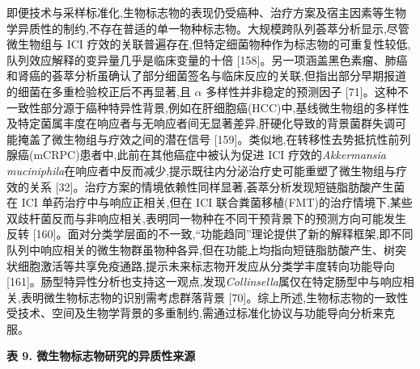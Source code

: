 即便技术与采样标准化,生物标志物的表现仍受癌种、治疗方案及宿主因素等生物学异质性的制约,不存在普适的单一物种标志物。大规模跨队列荟萃分析显示,尽管微生物组与 ICI 疗效的关联普遍存在,但特定细菌物种作为标志物的可重复性较低,队列效应解释的变异量几乎是临床变量的十倍 {[}158{]}。另一项涵盖黑色素瘤、肺癌和肾癌的荟萃分析虽确认了部分细菌签名与临床反应的关联,但指出部分早期报道的细菌在多重检验校正后不再显著,且 \(\alpha\) 多样性并非稳定的预测因子 {[}71{]}。这种不一致性部分源于癌种特异性背景,例如在肝细胞癌(HCC)中,基线微生物组的多样性及特定菌属丰度在响应者与无响应者间无显著差异,肝硬化导致的背景菌群失调可能掩盖了微生物组与疗效之间的潜在信号 {[}159{]}。类似地,在转移性去势抵抗性前列腺癌(mCRPC)患者中,此前在其他癌症中被认为促进 ICI 疗效的\emph{Akkermansia muciniphila}在响应者中反而减少,提示既往内分泌治疗史可能重塑了微生物组与疗效的关系 {[}32{]}。治疗方案的情境依赖性同样显著,荟萃分析发现短链脂肪酸产生菌在 ICI 单药治疗中与响应正相关,但在 ICI 联合粪菌移植(FMT)的治疗情境下,某些双歧杆菌反而与非响应相关,表明同一物种在不同干预背景下的预测方向可能发生反转 {[}160{]}。面对分类学层面的不一致,``功能趋同''理论提供了新的解释框架,即不同队列中响应相关的微生物群虽物种各异,但在功能上均指向短链脂肪酸产生、树突状细胞激活等共享免疫通路,提示未来标志物开发应从分类学丰度转向功能导向 {[}161{]}。肠型特异性分析也支持这一观点,发现\emph{Collinsella}属仅在特定肠型中与响应相关,表明微生物标志物的识别需考虑群落背景 {[}70{]}。综上所述,生物标志物的一致性受技术、空间及生物学背景的多重制约,需通过标准化协议与功能导向分析来克服。

\textbf{表 9. 微生物标志物研究的异质性来源}

